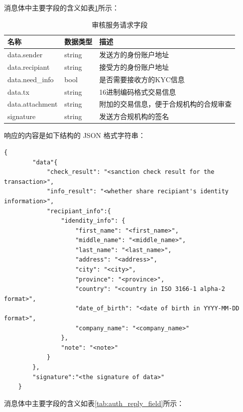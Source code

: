 消息体中主要字段的含义如表\ref{tab:auth_req_field}所示：

\begin{table}[h]
    \caption{审核服务请求字段} 
    \label{tab:auth_req_field}
    \small %
    \centering %
    \begin{tabular}{lll} %
        \toprule[\heavyrulewidth]\toprule[\heavyrulewidth]
        \textbf{名称} & \textbf{数据类型} & \textbf{描述} \\ 
        \hline
        data.sender & string & 发送方的身份账户地址 \\
        \hline
        data.recipiant & string & 接受方的身份账户地址 \\
        \hline
        data.need\_info & bool & 是否需要接收方的KYC信息 \\
        \hline
        data.tx & string & 16进制编码格式交易信息 \\
        \hline
        data.attachment & string & 附加的交易信息，便于合规机构的合规审查 \\
        \hline
        signature & string & 发送方合规机构的签名 \\
        \bottomrule[\heavyrulewidth] 
    \end{tabular}
\end{table}

响应的内容是如下结构的 JSON 格式字符串：

\begin{lstlisting}[caption={审核服务响应}, label={lst:auth_reply}]
    {
        "data"{
            "check_result": "<sanction check result for the transaction>",
            "info_result": "<whether share recipiant's identity information>",
            "recipiant_info":{
                "idendity_info": {
                    "first_name": "<first_name>",
                    "middle_name": "<middle_name>",
                    "last_name": "<last_name>",
                    "address": "<address>",
                    "city": "<city>",
                    "province": "<province>",
                    "country": "<country in ISO 3166-1 alpha-2 format>",
                    "date_of_birth": "<date of birth in YYYY-MM-DD format>",
                    "company_name": "<company_name>"
                },
                "note": "<note>"
            }
        },
        "signature":"<the signature of data>"
    }
\end{lstlisting}

消息体中主要字段的含义如表\ref{tab:auth_reply_field}所示：

